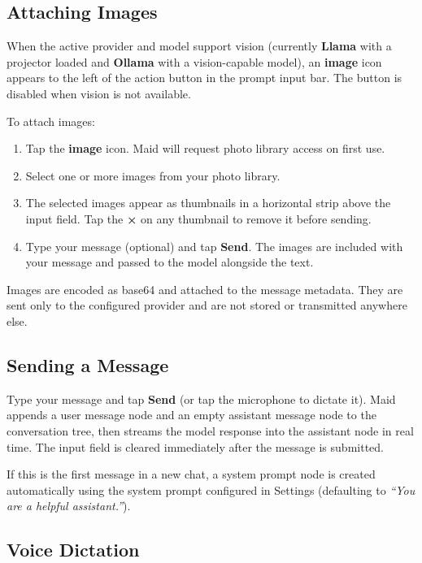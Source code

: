 \documentclass[12pt,a4paper]{article}
\begin{document}
\subsection{Attaching Images}
\label{sec:images}

When the active provider and model support vision (currently \textbf{Llama} with a projector loaded and \textbf{Ollama} with a vision-capable model), an \textbf{image} icon appears to the left of the action button in the prompt input bar. The button is disabled when vision is not available.

To attach images:

\begin{enumerate}[noitemsep]
    \item Tap the \textbf{image} icon. Maid will request photo library access on first use.
    \item Select one or more images from your photo library.
    \item The selected images appear as thumbnails in a horizontal strip above the input field. Tap the \textbf{×} on any thumbnail to remove it before sending.
    \item Type your message (optional) and tap \textbf{Send}. The images are included with your message and passed to the model alongside the text.
\end{enumerate}

Images are encoded as base64 and attached to the message metadata. They are sent only to the configured provider and are not stored or transmitted anywhere else.

\subsection{Sending a Message}

Type your message and tap \textbf{Send} (or tap the microphone to dictate it). Maid appends a user message node and an empty assistant message node to the conversation tree, then streams the model response into the assistant node in real time. The input field is cleared immediately after the message is submitted.

If this is the first message in a new chat, a system prompt node is created automatically using the system prompt configured in Settings (defaulting to \emph{``You are a helpful assistant.''}).

\subsection{Voice Dictation}
\label{sec:dictation}
\end{document}

